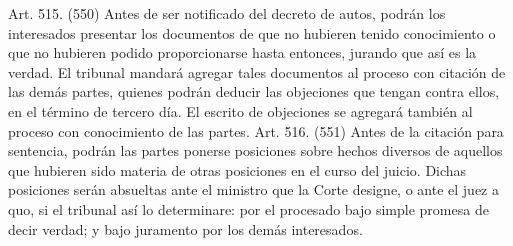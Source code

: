     Art. 515. (550) Antes de ser notificado del decreto de autos, podrán los interesados presentar los documentos de que no hubieren tenido conocimiento o que no hubieren podido proporcionarse hasta entonces, jurando que así es la verdad.
    El tribunal mandará agregar tales documentos al proceso con citación de las demás partes, quienes podrán deducir las objeciones que tengan contra ellos, en el término de tercero día. El escrito de objeciones se agregará también al proceso con conocimiento de las partes.
    Art. 516. (551) Antes de la citación para sentencia, podrán las partes ponerse posiciones sobre hechos diversos de aquellos que hubieren sido materia de otras posiciones en el curso del juicio.
    Dichas posiciones serán absueltas ante el ministro que la Corte designe, o ante el juez a quo, si el tribunal así lo determinare: por el procesado bajo simple promesa de decir verdad; y bajo juramento por los demás interesados.



